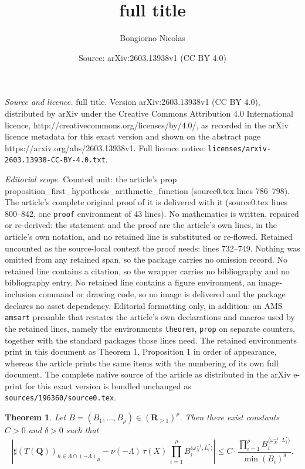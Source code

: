 \documentclass[10pt,a4paper]{amsart}
\title{full title}
\author{Bongiorno Nicolas}
\date{Source: arXiv:2603.13938v1 (CC BY 4.0)}
\newtheorem{theorem}{Theorem}
\newcommand{\Q}{\mathbf{Q}}
\newcommand{\R}{\mathbf{R}}
\newcommand{\w}{\omega}
\begin{document}
\maketitle

\noindent\emph{Source and licence.} full title. Version arXiv:2603.13938v1 (CC BY 4.0), distributed by arXiv under the Creative Commons Attribution 4.0 International licence, http://creativecommons.org/licenses/by/4.0/, as recorded in the arXiv licence metadata for this exact version and shown on the abstract page https://arxiv.org/abs/2603.13938v1. Full licence notice: \texttt{licenses/arxiv-2603.13938-CC-BY-4.0.txt}.\par\smallskip

\noindent\textit{Editorial scope.} Counted unit: the article's prop proposition\_first\_hypothesis\_arithmetic\_function (source0.tex lines 786--798). The article's complete original proof of it is delivered with it (source0.tex lines 800--842, one \texttt{proof} environment of 43 lines). No mathematics is written, repaired or re-derived: the statement and the proof are the article's own lines, in the article's own notation, and no retained line is substituted or re-flowed.  Retained uncounted as the source-local context the proof needs: lines 732--749.  Nothing was omitted from any retained span, so the package carries no omission record.  No retained line contains a citation, so the wrapper carries no bibliography and no bibliography entry.  No retained line contains a figure environment, an image-inclusion command or drawing code, so no image is delivered and the package declares no asset dependency.  Editorial formatting only, in addition: an AMS \texttt{amsart} preamble that restates the article's own declarations and macros used by the retained lines, namely the environments \texttt{theorem}, \texttt{prop} on separate counters, together with the standard packages those lines need.  The retained environments print in this document as Theorem 1, Proposition 1 in order of appearance, whereas the article prints the same items with the numbering of its own full document.  The complete native source of the article as distributed in the arXiv e-print for this exact version is bundled unchanged as \texttt{sources/196360/source0.tex}.
\begin{theorem}\label{theorem_multi_height_value_in_subcone}
Let \(B = (B_1,\ldots,B_{\rho}) \in (\R_{\geqslant 1})^{\rho}\).
Then there exist constants \(C > 0\) and \(\delta > 0\) such that
\[
\left|
\sharp ( T(\Q) )_{h \in \Lambda \cap (-\Lambda)_{B} }
-
\nu(-\Lambda)\, \tau(X)\,
\prod_{i = 1}^{\rho}
B_i^{\langle \w_{X}^{-1}, L_i^* \rangle}
\right|
\leqslant
C \cdot
\frac{\prod_{i = 1}^{\rho}
B_i^{\langle \w_{X}^{-1}, L_i^* \rangle}}
{\min(B_i)^{\delta}}.
\]
\end{theorem}
\end{document}

